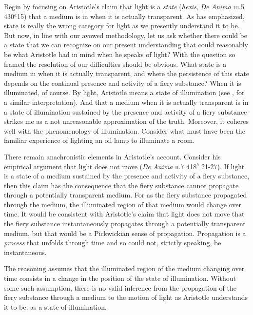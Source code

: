 \documentclass[12pt]{article}
\begin{document}
Begin by focusing on Aristotle's claim that light is a \emph{state} (\emph{hexis}, \emph{De Anima} \textsc{iii}.5 430\( ^{a} \)15) that a medium is in when it is actually transparent. As \citet{Burnyeat:1995fk} has emphasized, state is really the wrong category for light as we presently understand it to be. But now, in line with our avowed methodology, let us ask whether there could be a state that we can recognize on our present understanding that could reasonably be what Aristotle had in mind when he speaks of light? With the question so framed the resolution of our difficulties should be obvious. What state is a medium in when it is actually transparent, and where the persistence of this state depends on the continual presence and activity of a fiery substance? When it is illuminated, of course. By light, Aristotle means a state of illumination (see \citealt[122]{Thorp:1982fk}, for a similar interpretation). And that a medium when it is actually transparent is in a state of illumination sustained by the presence and activity of a fiery substance strikes me as a not unreasonable approximation of the truth. Moreover, it coheres well with the phenomenology of illumination. Consider what must have been the familiar experience of lighting an oil lamp to illuminate a room.

There remain anachronistic elements in Aristotle's account. Consider his empirical argument that light does not move (\emph{De Anima} \textsc{ii}.7 418\( ^{b} \) 21-27). If light is a state of a medium sustained by the presence and activity of a fiery substance, then this claim has the consequence that the fiery substance cannot propagate through a potentially transparent medium. For as the fiery substance propagated through the medium, the illuminated region of that medium would change over time. It would be consistent with Aristotle's claim that light does not move that the fiery substance instantaneously propagates through a potentially transparent medium, but that would be a Pickwickian sense of propagation. Propagation is a \emph{process} that unfolds through time and so could not, strictly speaking, be instantaneous.

The reasoning assumes that the illuminated region of the medium changing over time consists in a change in the position of the state of illumination. Without some such assumption, there is no valid inference from the propagation of the fiery substance through a medium to the motion of light as Aristotle understands it to be, as a state of illumination.
\end{document}
